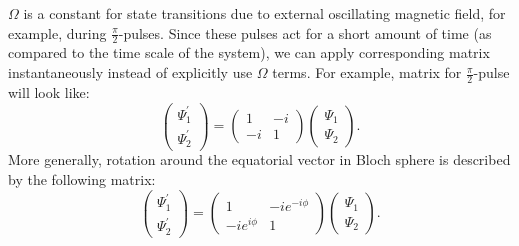 \documentclass[12pt,notitlepage]{report}
\begin{document}
$\Omega$ is a constant for state transitions due to external oscillating magnetic field, for example, during $\frac{\pi}{2}$-pulses. Since these pulses act for a short amount of time (as compared to the time scale of the system), we can apply corresponding matrix instantaneously instead of explicitly use $\Omega$ terms. For example, matrix for $\frac{\pi}{2}$-pulse will look like:
\[
\begin{pmatrix}
	\Psi^\prime_1 \\	\Psi^\prime_2
\end{pmatrix} =
\begin{pmatrix}
	1 & -i \\ -i & 1
\end{pmatrix}
\begin{pmatrix}
	\Psi_1 \\ \Psi_2
\end{pmatrix}.
\]
More generally, rotation around the equatorial vector in Bloch sphere is described by the following matrix:
\[
\begin{pmatrix}
	\Psi^\prime_1 \\	\Psi^\prime_2
\end{pmatrix} =
\begin{pmatrix}
	1 & -i e^{-i \phi} \\ -i e^{i \phi} & 1
\end{pmatrix}
\begin{pmatrix}
	\Psi_1 \\ \Psi_2
\end{pmatrix}.
\]



\end{document}
